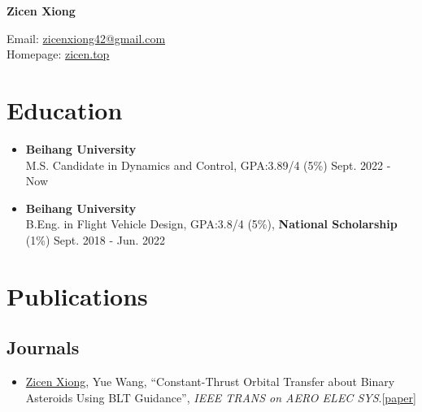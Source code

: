 \documentclass[11pt, a4paper]{article}
\begin{document}

\noindent
\begin{minipage}[t]{0.5\textwidth}
    {\LARGE \textbf{Zicen Xiong}}
\end{minipage}%
\begin{minipage}[t]{0.5\textwidth}
    \flushright
    Email: \href{mailto:zicenxiong42@gmail.com}{zicenxiong42@gmail.com} \\
    Homepage: \href{https://zicen.top}{zicen.top}
\end{minipage}

\vspace{10pt}
{}

\section*{Education}

\begin{itemize}[leftmargin=*]
    \item \textbf{Beihang University} \\
    M.S. Candidate in Dynamics and Control, GPA:3.89/4 (5\%)  \hfill Sept. 2022 - Now 
    \item \textbf{Beihang University} \\
    B.Eng. in Flight Vehicle Design, GPA:3.8/4 (5\%), \textbf{National Scholarship} (1\%) \hfill Sept. 2018 - Jun. 2022
    
\end{itemize}


\section*{Publications}
\subsection*{Journals}
\begin{itemize}
    \item   \underline{Zicen Xiong}, Yue Wang, ``Constant-Thrust Orbital Transfer about Binary Asteroids Using BLT Guidance'', \textit{IEEE TRANS on AERO ELEC SYS}.[\href{https://doi.org/10.1109/TAES.2024.3369005}{paper}]

\end{itemize}
\end{document}
